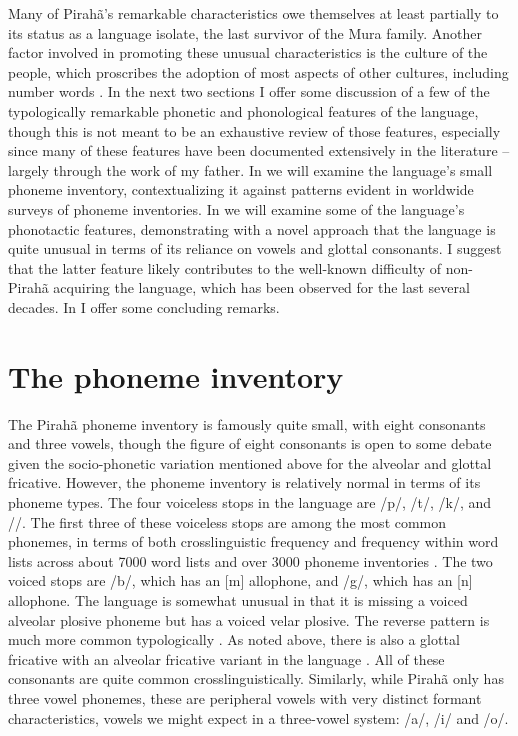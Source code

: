 \documentclass[output=paper,colorlinks,citecolor=brown
]{langscibook}
\begin{document}
    Many of Pirahã’s remarkable characteristics owe themselves at least partially to its status as a language isolate, the last survivor of the Mura family. Another factor involved in promoting these unusual characteristics is the culture of the people, which proscribes the adoption of most aspects of other cultures, including number words \citep{everett2005cultural}. In the next two sections I offer some discussion of a few of the typologically remarkable phonetic and phonological features of the language, though this is not meant to be an exhaustive review of those features, especially since many of these features have been documented extensively in the literature -- largely through the work of my father. In  we will examine the language’s small phoneme inventory, contextualizing it against patterns evident in worldwide surveys of phoneme inventories. In  we will examine some of the language’s phonotactic features, demonstrating with a novel approach that the language is quite unusual in terms of its reliance on vowels and glottal consonants. I suggest that the latter feature likely contributes to the well-known difficulty of non-Pirahã acquiring the language, which has been observed for the last several decades. In  I offer some concluding remarks. 


\section{The phoneme inventory}\label{sec:everett:2}

    The Pirahã phoneme inventory is famously quite small, with eight consonants and three vowels, though the figure of eight consonants is open to some debate given the socio-phonetic variation mentioned above for the alveolar and glottal fricative. However, the phoneme inventory is relatively normal in terms of its phoneme types. The four voiceless stops in the language are /p/, /t/, /k/, and /{\textglotstop}/. The first three of these voiceless stops are among the most common phonemes, in terms of both crosslinguistic frequency and frequency within word lists across about 7000 word lists and over 3000 phoneme inventories \citep{everett2018similar, everett2021sounds}. The two voiced stops are /b/, which has an [m] allophone, and /g/, which has an [n] allophone. The language is somewhat unusual in that it is missing a voiced alveolar plosive phoneme but has a voiced velar plosive. The reverse pattern is much more common typologically \citep{everett2018global}. As noted above, there is also a glottal fricative with an alveolar fricative variant in the language \citep{everett1986piraha}. All of these consonants are quite common crosslinguistically. Similarly, while Pirahã only has three vowel phonemes, these are peripheral vowels with very distinct formant characteristics, vowels we might expect in a three-vowel system: /a/, /i/ and /o/.
\end{document}
